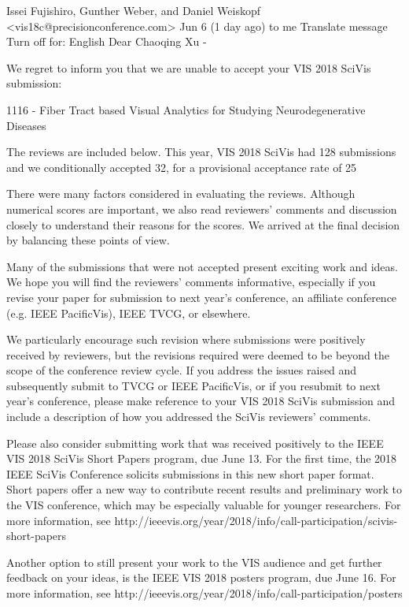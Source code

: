 
Issei Fujishiro, Gunther Weber, and Daniel Weiskopf <vis18c@precisionconference.com>
Jun 6 (1 day ago)
to me 
   Translate message
Turn off for: English
Dear Chaoqing Xu -

We regret to inform you that we are unable to accept your VIS 2018 SciVis submission:

  1116 - Fiber Tract based Visual Analytics for Studying Neurodegenerative Diseases

The reviews are included below. This year, VIS 2018 SciVis had 128 submissions and we conditionally accepted 32, for a provisional acceptance rate of 25%

There were many factors considered in evaluating the reviews. Although numerical scores are important, we also read reviewers’ comments and discussion closely to understand their reasons for the scores. We arrived at the final decision by balancing these points of view.

Many of the submissions that were not accepted present exciting work and ideas. We hope you will find the reviewers' comments informative, especially if you revise your paper for submission to next year's conference, an affiliate conference (e.g. IEEE PacificVis), IEEE TVCG, or elsewhere.

We particularly encourage such revision where submissions were positively received by reviewers, but the revisions required were deemed to be beyond the scope of the conference review cycle. If you address the issues raised and subsequently submit to TVCG or IEEE PacificVis, or if you resubmit to next year's conference, please make reference to your VIS 2018 SciVis submission and include a description of how you addressed the SciVis reviewers' comments. 

Please also consider submitting work that was received positively to the IEEE VIS 2018 SciVis Short Papers program, due June 13. For the first time, the 2018 IEEE SciVis Conference solicits submissions in this new short paper format. Short papers offer a new way to contribute recent results and preliminary work to the VIS conference, which may be especially valuable for younger researchers. For more information, see http://ieeevis.org/year/2018/info/call-participation/scivis-short-papers

Another option to still present your work to the VIS audience and get further feedback on your ideas, is the IEEE VIS 2018 posters program, due June 16.  For more information, see http://ieeevis.org/year/2018/info/call-participation/posters

